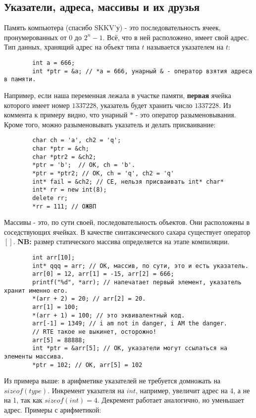 \documentclass[15pt, a4paper]{article}
\newcommand{\nl}{\newline}
\begin{document}
    \subsection{Указатели, адреса, массивы и их друзья}
    Память компьютера (спасибо SKKV'у) - это последовательность ячеек, пронумерованных от $0$ до $2^n-1$. Всё, что в ней расположено,
    имеет свой адрес. Тип данных, хранящий адрес на объект типа $t$ называется указателем на $t$:
    \begin{verbatim}
        int a = 666;
        int *ptr = &a; // *a = 666, унарный & - оператор взятия адреса в памяти.      
    \end{verbatim} 
    Например, если наша переменная лежала в участке памяти, \textbf{первая} ячейка которого имеет номер $1337228$, указатель будет хранить число $1337228$.
    Из коммента к примеру видно, что унарный $*$ - это оператор разыменовывания. Кроме того, можно разыменовывать указатель и делать присваивание:
    \begin{verbatim}
        char ch = 'a', ch2 = 'q';
        char *ptr = &ch;
        char *ptr2 = &ch2;
        *ptr = 'b';  // OK, ch = 'b'.
        *ptr = *ptr2; // OK, ch = 'q', ch2 = 'q'
        int* fail = &ch2; // CE, нельзя присваивать int* char*
        int* rr = new int(8);
        delete rr;
        *rr = 111; // ОЖВП
    \end{verbatim}
    Массивы - это, по сути своей, последовательность объектов. Они расположены в соседствующих ячейках. В качестве синтаксического сахара существует оператор $[]$. \nl
    \textbf{NB:} размер статического массива определяется на этапе компиляции.
    \begin{verbatim}
        int arr[10];
        int* qqq = arr; // ОК, массив, по сути, это и есть указатель.
        arr[0] = 12, arr[1] = -15, arr[2] = 666;
        printf("%d", *arr); // напечатает первый элемент, указатель хранит именно его.
        *(arr + 2) = 20; // arr[2] = 20.
        arr[1] = 100;
        *(arr + 1) = 100; // это эквивалентный код. 
        arr[-1] = 1349; // i am not in danger, i AM the danger.
        // RTE такое не выкинет, осторожно!
        arr[5] = 88888;
        int *ptr = &arr[5]; // OK, указатели могут ссылаться на элементы массива.
        *ptr = 102; // OK, arr[5] = 102
    \end{verbatim}
    Из примера выше: в арифметике указателей не требуется домножать на $sizeof(type)$. Инкремент указателя на $int$, например, увеличит адрес
    на 4, а не на 1, так как $sizeof(int) = 4$. Декремент работает аналогично, но уменьшает адрес. Примеры с арифметикой: 
\end{document}
